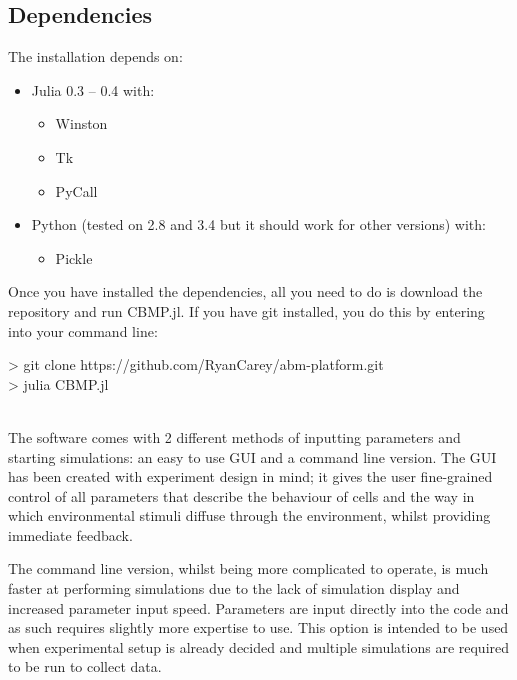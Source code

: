 \documentclass[12pt]{article}
\begin{document}
\subsection{Dependencies}

The installation depends on:

\begin{itemize}
  \setlength\itemsep{1em}
\item Julia 0.3 -- 0.4 with:
\begin{itemize}
  \setlength\itemsep{1em}
\item Winston
\item Tk
\item PyCall
\end{itemize}
\item Python (tested on 2.8 and 3.4 but it should work for other 
versions) with:
\begin{itemize}
  \setlength\itemsep{1em}
\item Pickle
\end{itemize}
\end{itemize}

Once you have installed the dependencies, all you need to do is download 
the repository and run CBMP.jl. If you have git installed, you do this 
by entering into your command line: \\

{\fontsize{11pt}{11pt} \ttfamily 

> git clone https://github.com/RyanCarey/abm-platform.git \\

> julia CBMP.jl} \\

The software comes with 2 different methods of inputting parameters and 
starting simulations: an easy to use GUI and a command line version. The 
GUI has been created with experiment design in mind; it gives the user 
fine-grained control of all parameters that describe the behaviour of 
cells and the way in which environmental stimuli diffuse through the 
environment, whilst providing immediate feedback.

The command line version, whilst being more complicated to operate, is 
much faster at performing simulations due to the lack of simulation 
display and increased parameter input speed. Parameters are input 
directly into the code and as such requires slightly more expertise to 
use. This option is intended to be used when experimental setup is 
already decided and multiple simulations are required to be run to 
collect data.
\end{document}
